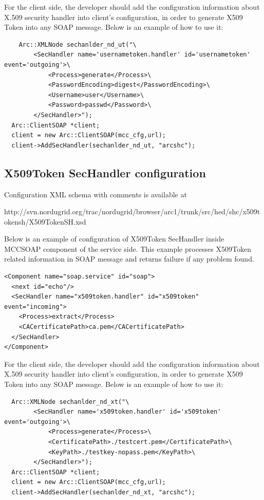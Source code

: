 \documentclass{article}                            %
\begin{document}
For the client side, the developer should add the configuration information about X.509 security handler into client's configuration, in order to generate X509 Token into any SOAP message. Below is an example of how to use it:

\begin{verbatim}
    Arc::XMLNode sechanlder_nd_ut("\ 
        <SecHandler name='usernametoken.handler' id='usernametoken' event='outgoing'>\ 
            <Process>generate</Process>\ 
            <PasswordEncoding>digest</PasswordEncoding>\ 
            <Username>user</Username>\ 
            <Password>passwd</Password>\ 
        </SecHandler>"); 
  Arc::ClientSOAP *client; 
  client = new Arc::ClientSOAP(mcc_cfg,url); 
  client->AddSecHandler(sechanlder_nd_ut, "arcshc");
\end{verbatim}

\subsection{X509Token SecHandler configuration} %
\label{subsec:xt_sechandler_conf}
Configuration XML schema with comments is available at 

http://svn.nordugrid.org/trac/nordugrid/browser/arc1/trunk/src/hed/shc/x509tokensh/X509TokenSH.xsd

Below is an example of configuration of X509Token SecHandler inside MCCSOAP component of the service side. This example processes X509Token related information in SOAP message and returns failure if any problem found.

\begin{verbatim}
<Component name="soap.service" id="soap">
  <next id="echo"/>
  <SecHandler name="x509token.handler" id="x509token" event="incoming">
    <Process>extract</Process>
    <CACertificatePath>ca.pem</CACertificatePath>
  </SecHandler>
</Component>
\end{verbatim}

For the client side, the developer should add the configuration information about X.509 security handler into client's configuration, in order to generate X509 Token into any SOAP message. Below is an example of how to use it:

\begin{verbatim}
  Arc::XMLNode sechanlder_nd_xt("\ 
        <SecHandler name='x509token.handler' id='x509token' event='outgoing'>\ 
            <Process>generate</Process>\ 
            <CertificatePath>./testcert.pem</CertificatePath>\ 
            <KeyPath>./testkey-nopass.pem</KeyPath>\ 
        </SecHandler>"); 
  Arc::ClientSOAP *client; 
  client = new Arc::ClientSOAP(mcc_cfg,url); 
  client->AddSecHandler(sechanlder_nd_xt, "arcshc");
\end{verbatim}
\end{document}
